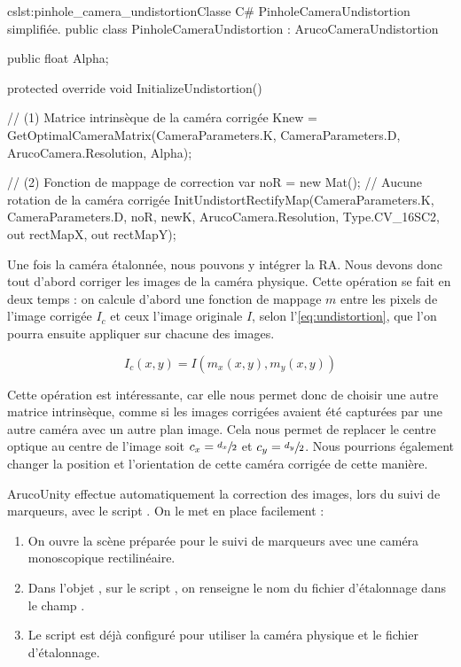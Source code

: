 \begin{listingETS}{cs}{lst:pinhole_camera_undistortion}{Classe C\# PinholeCameraUndistortion simplifiée.}
  public class PinholeCameraUndistortion : ArucoCameraUndistortion
  {
    public float Alpha;

    protected override void InitializeUndistortion()
    {
      // (1) Matrice intrinsèque de la caméra corrigée
      Knew = GetOptimalCameraMatrix(CameraParameters.K, CameraParameters.D, ArucoCamera.Resolution, Alpha);

      // (2) Fonction de mappage de correction
      var noR = new Mat(); // Aucune rotation de la caméra corrigée
      InitUndistortRectifyMap(CameraParameters.K, CameraParameters.D, noR, newK, ArucoCamera.Resolution, Type.CV_16SC2, out rectMapX, out rectMapY);
    }
  }
\end{listingETS}

Une fois la caméra étalonnée, nous pouvons y intégrer la RA. Nous devons donc tout d'abord corriger les images de la caméra physique. Cette opération se fait en deux temps : on calcule d'abord une fonction de mappage $m$ entre les pixels de l'image corrigée $I_c$ et ceux l'image originale $I$, selon l'\autoref{eq:undistortion}, que l'on pourra ensuite appliquer sur chacune des images.

\begin{equation}
  \label{eq:undistortion}
  I_c(x,y) = I(m_x(x,y), m_y(x,y))
\end{equation}

Cette opération est intéressante, car elle nous permet donc de choisir une autre matrice intrinsèque, comme si les images corrigées avaient été capturées par une autre caméra avec un autre plan image. Cela nous permet de replacer le centre optique au centre de l'image soit $c_x = \sfrac{d_x}{2}$ et $c_y = \sfrac{d_y}{2}$. Nous pourrions également changer la position et l'orientation de cette caméra corrigée de cette manière.

ArucoUnity effectue automatiquement la correction des images, lors du suivi de marqueurs, avec le script . On le met en place facilement  :
\begin{enumerate}
  \item On ouvre la scène  préparée pour le suivi de marqueurs avec une caméra monoscopique rectilinéaire.
  \item Dans l'objet , sur le script , on renseigne le nom du fichier d'étalonnage dans le champ .
  \item Le script  est déjà configuré pour utiliser la caméra physique et le fichier d'étalonnage.
\end{enumerate}
\medskip

